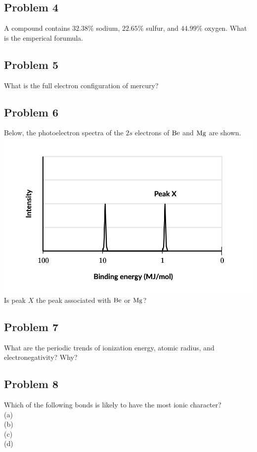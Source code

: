 \documentclass{article}
\begin{document}
\subsection*{Problem 4}
A compound contains \(32.38\%\) sodium, \(22.65\%\) sulfur, and \(44.99\%\) oxygen. What is the emperical forumula. 
\subsection*{Problem 5}
What is the full electron configuration of mercury?
\subsection*{Problem 6}
Below, the photoelectron spectra of the \(2s\) electrons of \(\ce{Be}\) and \(\ce{Mg}\) are shown.
\includegraphics[scale = 0.5]{photos/photo2.png} \\
Is peak \(X\) the peak associated with \(\ce{Be}\) or \(\ce{Mg}\)?
\subsection*{Problem 7}
What are the periodic trends of ionization energy, atomic radius, and electronegativity? Why?
\subsection*{Problem 8}
Which of the following bonds is likely to have the most ionic character? \\
(a)  \\
(b)  \\
(c) \\
(d) 
\end{document}
